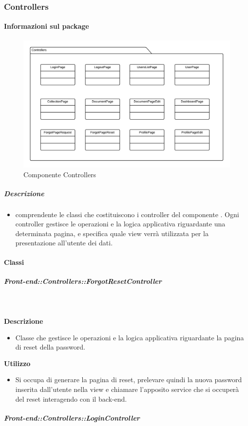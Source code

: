   \subsubsection{Controllers}
  \paragraph{Informazioni sul package}
    \begin{figure}[H] 
      \begin{center} 
        \includegraphics[width=\textwidth]{uml/package/Front-end::Controllers.png}  
        \caption{Componente Controllers}
      \end{center}  
    \end{figure} 
  \subparagraph{Descrizione} 
    \begin{itemize}
    \item[]  comprendente le classi che costituiscono i controller del componente . Ogni controller gestisce le operazioni e la logica applicativa riguardante una determinata pagina, e specifica quale view verrà utilizzata per la presentazione all'utente dei dati.
    \end{itemize} 
    \paragraph{Classi}
      \subparagraph{Front-end::Controllers::ForgotResetController}
        
        \textbf{\\ \\ Descrizione} 
          \begin{itemize}
            \item[] Classe che gestisce le operazioni e la logica applicativa riguardante la pagina di reset della password.
          \end{itemize}      
        \textbf{Utilizzo}  
          \begin{itemize}
            \item[] Si occupa di generare la pagina di reset, prelevare quindi la nuova password inserita dall'utente nella view e chiamare l'apposito service che si occuperà del reset interagendo con il back-end.
          \end{itemize}
      \subparagraph{Front-end::Controllers::LoginController}
        

